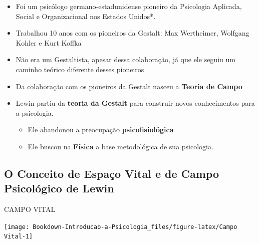 \documentclass[
]{book}
\providecommand{\tightlist}{%
  \setlength{\itemsep}{0pt}\setlength{\parskip}{0pt}}
\begin{document}
\begin{itemize}
\tightlist
\item
  Foi um psicólogo germano-estadunidense pioneiro da Psicologia Aplicada, Social e Organizacional nos Estados Unidos*.
\item
  Trabalhou 10 anos com os pioneiros da Gestalt: Max Wertheimer, Wolfgang Kohler e Kurt Koffka
\item
  Não era um Gestaltista, apesar dessa colaboração, já que ele seguiu um caminho teórico diferente desses pioneiros
\item
  Da colaboração com os pioneiros da Gestalt nasceu a \textbf{Teoria de Campo}
\item
  Lewin partiu da \textbf{teoria da Gestalt} para construir novos conhecimentos para a psicologia.

  \begin{itemize}
  \tightlist
  \item
    Ele abandonou a preocupação \textbf{psicofisiológica}
  \item
    Ele buscou na \textbf{Física} a base metodológica de sua psicologia.
  \end{itemize}
\end{itemize}

\hypertarget{o-conceito-de-espauxe7o-vital-e-de-campo-psicoluxf3gico-de-lewin-1}{%
\subsection{\texorpdfstring{O Conceito de \textbf{Espaço Vital} e de \textbf{Campo Psicológico} de Lewin}{O Conceito de Espaço Vital e de Campo Psicológico de Lewin}}\label{o-conceito-de-espauxe7o-vital-e-de-campo-psicoluxf3gico-de-lewin-1}}

CAMPO VITAL

\texttt{[image: Bookdown-Introducao-a-Psicologia\_files/figure-latex/Campo Vital-1]}
\end{document}
